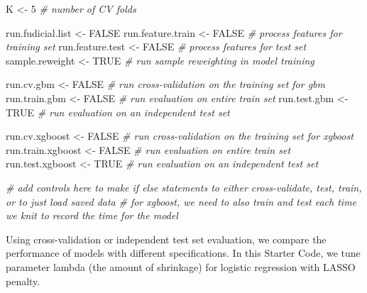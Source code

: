 \documentclass[
]{article}
\newenvironment{Shaded}{\begin{snugshade}}{\end{snugshade}}
\newcommand{\CommentTok}[1]{\textcolor[rgb]{0.56,0.35,0.01}{\textit{#1}}}
\newcommand{\DecValTok}[1]{\textcolor[rgb]{0.00,0.00,0.81}{#1}}
\newcommand{\NormalTok}[1]{#1}
\newcommand{\OtherTok}[1]{\textcolor[rgb]{0.56,0.35,0.01}{#1}}
\newcommand{\StringTok}[1]{\textcolor[rgb]{0.31,0.60,0.02}{#1}}
\begin{document}
\begin{Shaded}
\begin{Highlighting}[]
\NormalTok{K <-}\StringTok{ }\DecValTok{5}  \CommentTok{# number of CV folds}

\NormalTok{run.fudicial.list <-}\StringTok{ }\OtherTok{FALSE}
\NormalTok{run.feature.train <-}\StringTok{ }\OtherTok{FALSE} \CommentTok{# process features for training set}
\NormalTok{run.feature.test <-}\StringTok{ }\OtherTok{FALSE} \CommentTok{# process features for test set}
\NormalTok{sample.reweight <-}\StringTok{ }\OtherTok{TRUE} \CommentTok{# run sample reweighting in model training}

\NormalTok{run.cv.gbm <-}\StringTok{ }\OtherTok{FALSE} \CommentTok{# run cross-validation on the training set for gbm }
\NormalTok{run.train.gbm <-}\StringTok{ }\OtherTok{FALSE} \CommentTok{# run evaluation on entire train set}
\NormalTok{run.test.gbm <-}\StringTok{ }\OtherTok{TRUE} \CommentTok{# run evaluation on an independent test set}

\NormalTok{run.cv.xgboost <-}\StringTok{ }\OtherTok{FALSE} \CommentTok{# run cross-validation on the training set for xgboost }
\NormalTok{run.train.xgboost <-}\StringTok{ }\OtherTok{FALSE} \CommentTok{# run evaluation on entire train set}
\NormalTok{run.test.xgboost <-}\StringTok{ }\OtherTok{TRUE} \CommentTok{# run evaluation on an independent test set}

\CommentTok{# add controls here to make if else statements to either cross-validate, test, train, or to just load saved data}
\CommentTok{# for xgboost, we need to also train and test each time we knit to record the time for the model }
\end{Highlighting}
\end{Shaded}

Using cross-validation or independent test set evaluation, we compare
the performance of models with different specifications. In this Starter
Code, we tune parameter lambda (the amount of shrinkage) for logistic
regression with LASSO penalty.
\end{document}
